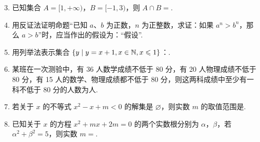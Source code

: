 \documentclass[a4paper,11pt]{article}
\begin{document}


\begin{enumerate}
\setcounter{enumi}{2}

\item 已知集合 $A=[1,+\infty)$，$B=[-1,3)$，则 $A\cap B=$\blankline[4.4em].

\ifanswer
\ans{$[1,3)$}
\fi

\item 用反证法证明命题“已知 $a$、$b$ 为正数，$n$ 为正整数，求证：如果 $a^n>b^n$，那么 $a>b$”时，应当作出的假设为：“假设\blankline[4.4em]”.

\ifanswer
{}
\fi

\item 用列举法表示集合 $\{y\mid y=x+1,x\in\mathbb{N},x\leqslant1\}$：\blankline[4.4em].

\ifanswer
{}
\fi

\item 某班在一次测验中，有 36 人数学成绩不低于 80 分，有 20 人物理成绩不低于 80 分，有 15 人的数学、物理成绩都不低于 80 分，则这两科成绩中至少有一科不低于 80 分的人数为\blankline[4.4em]人.

\ifanswer
\solbegin
{}
\solend
\fi

\item 若关于 $x$ 的不等式 $x^2-x+m<0$ 的解集是 $\varnothing$，则实数 $m$ 的取值范围是\blankline[4.4em].

\ifanswer
\solbegin
{}
\solend
\fi

\item 已知关于 $x$ 的方程 $x^2+mx+2m=0$ 的两个实数根分别为 $\alpha$，$\beta$，若 $\alpha^2+\beta^2=5$，则实数 $m=$\blankline[4.4em].

\ifanswer
\solbegin
{}
\solend
\fi


\end{enumerate}
\end{document}
